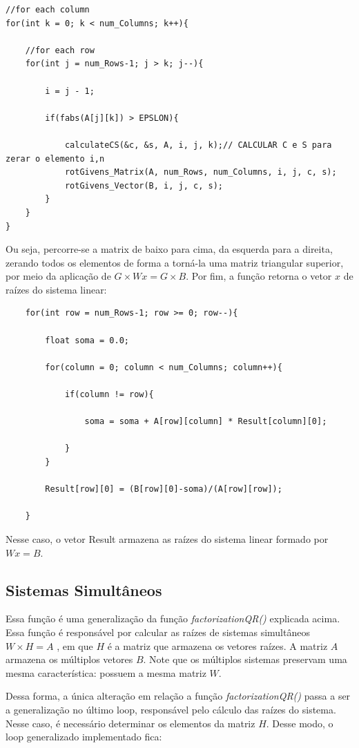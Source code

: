 \documentclass[twocolumn,amsmath,amssymb,floatfix]{revtex4}
\begin{document}
\begin{lstlisting}
//for each column
for(int k = 0; k < num_Columns; k++){

	//for each row
	for(int j = num_Rows-1; j > k; j--){

		i = j - 1;

		if(fabs(A[j][k]) > EPSLON){

			calculateCS(&c, &s, A, i, j, k);// CALCULAR C e S para zerar o elemento i,n
			rotGivens_Matrix(A, num_Rows, num_Columns, i, j, c, s);
			rotGivens_Vector(B, i, j, c, s);
		}
	}
}
\end{lstlisting}

Ou seja, percorre-se a matrix de baixo para cima, da esquerda para a direita, zerando todos os elementos de forma a torná-la uma matriz triangular superior, por meio da aplicação de $G \times Wx = G \times B$.
Por fim, a função retorna o vetor $x$ de raízes do sistema linear:

\begin{lstlisting}
	for(int row = num_Rows-1; row >= 0; row--){

		float soma = 0.0;

		for(column = 0; column < num_Columns; column++){

			if(column != row){

				soma = soma + A[row][column] * Result[column][0];

			}
		}

		Result[row][0] = (B[row][0]-soma)/(A[row][row]);

	}
\end{lstlisting}

Nesse caso, o vetor Result armazena as raízes do sistema linear formado por $Wx=B$.

\subsection{Sistemas Simultâneos}

Essa função é uma generalização da função \textit{factorizationQR()} explicada acima. Essa função é responsável por calcular as raízes de sistemas simultâneos $W \times H = A$ , em que $H$ é a matriz que armazena os vetores raízes. A matriz $A$ armazena os múltiplos vetores $B$. Note que os múltiplos sistemas preservam uma mesma característica: possuem a mesma matriz $W$.

Dessa forma, a única alteração em relação a função \textit{factorizationQR()} passa a ser a generalização no último loop, responsável pelo cálculo das raízes do sistema. Nesse caso, é necessário determinar os elementos da matriz $H$. Desse modo, o loop generalizado implementado fica: 
\end{document}
